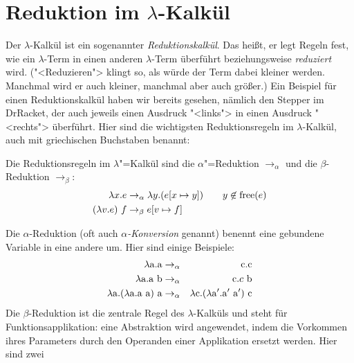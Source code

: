 \section{Reduktion im $\lambda$-Kalkül}

Der $\lambda$-Kalkül ist ein sogenannter
\textit{Reduktionskalkül}. Das heißt, er legt
Regeln fest, wie ein $\lambda$-Term in einen anderen $\lambda$-Term
überführt beziehungsweise \textit{reduziert} wird.  ("<Reduzieren">
klingt so, als würde der Term dabei kleiner werden.  Manchmal wird er
auch kleiner, manchmal aber auch größer.)  Ein Beispiel für einen
Reduktionskalkül haben wir bereits gesehen, nämlich den Stepper im
DrRacket, der auch jeweils einen Ausdruck "<links"> in einen Ausdruck
"<rechts"> überführt.  Hier sind die wichtigsten Reduktionsregeln im
$\lambda$-Kalkül, auch mit griechischen Buchstaben benannt:
%
\begin{definition}[Reduktionsregeln]
  Die Reduktionsregeln im $\lambda$"=Kalkül sind
  die $\alpha$"=Reduktion $\rightarrow_{\alpha}$ und die
  $\beta$-Reduktion $\rightarrow_{\beta}$:%
  \begin{alignat*}{2}
    \lambda x.e & \rightarrow_{\alpha} \lambda y.(e[x\mapsto y]) \quad 
    & y\not\in\operatorname{free}(e)
    \\
    (\lambda v.e)~f & \rightarrow_{\beta} e[v\mapsto f]
  \end{alignat*}
\end{definition}
%
Die $\alpha$-Reduktion (oft auch \textit{$\alpha$-Konversion} genannt)
benennt eine gebundene Variable in eine andere um.  Hier sind einige
Beispiele:
%
\begin{eqnarray*}
  \lambda \mathrm a.\mathrm a & \rightarrow_{\alpha} & \mathrm c.\mathrm c\\
  \lambda \mathrm a.\mathrm a~\mathrm b & \rightarrow_{\alpha} & \mathrm c.c~\mathrm b\\
  \lambda \mathrm a.(\lambda \mathrm a.\mathrm a~\mathrm a)~\mathrm a & \rightarrow_{\alpha} & 
  \lambda \mathrm c.(\lambda \mathrm a'.\mathrm a'~\mathrm a')~\mathrm c
\end{eqnarray*}
%
Die $\beta$-Reduktion ist die zentrale Regel des $\lambda$-Kalküls und steht für
Funktionsapplikation: eine Abstraktion
wird angewendet, indem die Vorkommen ihres Parameters durch den
Operanden einer Applikation ersetzt werden.  Hier sind zwei
